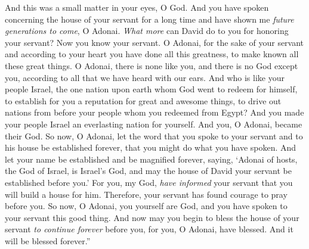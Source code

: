 \begin{biblechapter}
\verse And this was a small matter in your eyes, O God. And you have spoken concerning the house of your servant for a long time and have shown me \textit{future generations to come}, O Adonai.
\verse \textit{What more} can David do to you for honoring your servant? Now you know your servant.
\verse O Adonai, for the sake of your servant and according to your heart you have done all this greatness, to make known all these great things.
\verse O Adonai, there is none like you, and there is no God except you, according to all that we have heard with our ears.
\verse And who is like your people Israel, the one nation upon earth whom God went to redeem for himself, to establish for you a reputation for great and awesome things, to drive out nations from before your people whom you redeemed from Egypt?
\verse And you made your people Israel an everlasting nation for yourself. And you, O Adonai, became their God.
\verse So now, O Adonai, let the word that you spoke to your servant and to his house be established forever, that you might do what you have spoken.
\verse And let your name be established and be magnified forever, saying, ‘Adonai of hosts, the God of Israel, is Israel’s God, and may the house of David your servant be established before you.’
\verse For you, my God, \textit{have informed} your servant that you will build a house for him. Therefore, your servant has found courage to pray before you.
\verse So now, O Adonai, you yourself are God, and you have spoken to your servant this good thing.
\verse And now may you begin to bless the house of your servant \textit{to continue forever} before you, for you, O Adonai, have blessed. And it will be blessed forever.”
\end{biblechapter}

